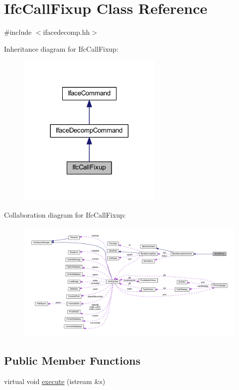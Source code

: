 \hypertarget{class_ifc_call_fixup}{}\section{Ifc\+Call\+Fixup Class Reference}
\label{class_ifc_call_fixup}


{\ttfamily \#include $<$ifacedecomp.\+hh$>$}



Inheritance diagram for Ifc\+Call\+Fixup\+:
\nopagebreak
\begin{figure}[H]
\begin{center}
\leavevmode
\includegraphics[width=197pt]{class_ifc_call_fixup__inherit__graph}
\end{center}
\end{figure}


Collaboration diagram for Ifc\+Call\+Fixup\+:
\nopagebreak
\begin{figure}[H]
\begin{center}
\leavevmode
\includegraphics[width=350pt]{class_ifc_call_fixup__coll__graph}
\end{center}
\end{figure}
\subsection*{Public Member Functions}
\begin{DoxyCompactItemize}
\item 
virtual void \mbox{\hyperlink{class_ifc_call_fixup_a303769cfca9f66c9409774fb823efd96}{execute}} (istream \&s)
\end{DoxyCompactItemize}
